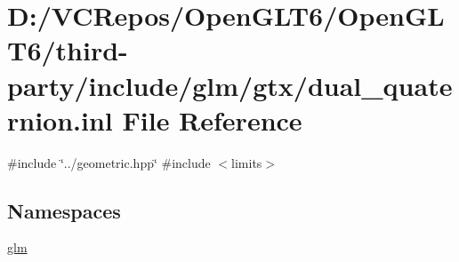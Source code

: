 \hypertarget{dual__quaternion_8inl}{}\section{D\+:/\+V\+C\+Repos/\+Open\+G\+L\+T6/\+Open\+G\+L\+T6/third-\/party/include/glm/gtx/dual\+\_\+quaternion.inl File Reference}
\label{dual__quaternion_8inl}
{\ttfamily \#include \char`\"{}../geometric.\+hpp\char`\"{}}\newline
{\ttfamily \#include $<$limits$>$}\newline
\subsection*{Namespaces}
\begin{DoxyCompactItemize}
\item 
 \mbox{\hyperlink{namespaceglm}{glm}}
\end{DoxyCompactItemize}
